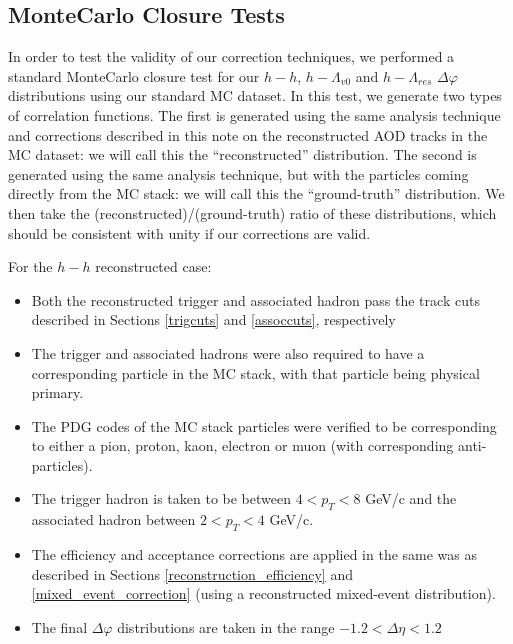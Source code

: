 \documentclass[ALICE,manyauthors]{ALICE_analysis_notes}
\begin{document}
\clearpage

\subsection{MonteCarlo Closure Tests}
\label{mc_closure}
In order to test the validity of our correction techniques, we performed a standard MonteCarlo closure test for our $h-h$, $h-\Lambda_{v0}$ and $h-\Lambda_{res}$ $\Delta\varphi$ distributions using our standard MC dataset. In this test, we generate two types of correlation functions. The first is generated using the same analysis technique and corrections described in this note on the reconstructed AOD tracks in the MC dataset: we will call this the ``reconstructed'' distribution. The second is generated using the same analysis technique, but with the particles coming directly from the MC stack: we will call this the ``ground-truth'' distribution. We then take the (reconstructed)/(ground-truth) ratio of these distributions, which should be consistent with unity if our corrections are valid. 

For the $h-h$ reconstructed case: 
\begin{itemize}
\item Both the reconstructed trigger and associated hadron pass the track cuts described in Sections \ref{trigcuts} and \ref{assoccuts}, respectively 
\item The trigger and associated hadrons were also required to have a corresponding particle in the MC stack, with that particle being physical primary.
\item The PDG codes of the MC stack particles were verified to be corresponding to either a pion, proton, kaon, electron or muon (with corresponding anti-particles).
\item The trigger hadron is taken to be between $4 < p_{T} < 8$ GeV/c and the associated hadron between $2 < p_{T} < 4$ GeV/c. 
\item The efficiency and acceptance corrections are applied in the same was as described in Sections \ref{reconstruction_efficiency} and \ref{mixed_event_correction} (using a reconstructed mixed-event distribution). 
\item The final $\Delta\varphi$ distributions are taken in the range $-1.2 < \Delta\eta < 1.2$
\end{itemize}
\end{document}
